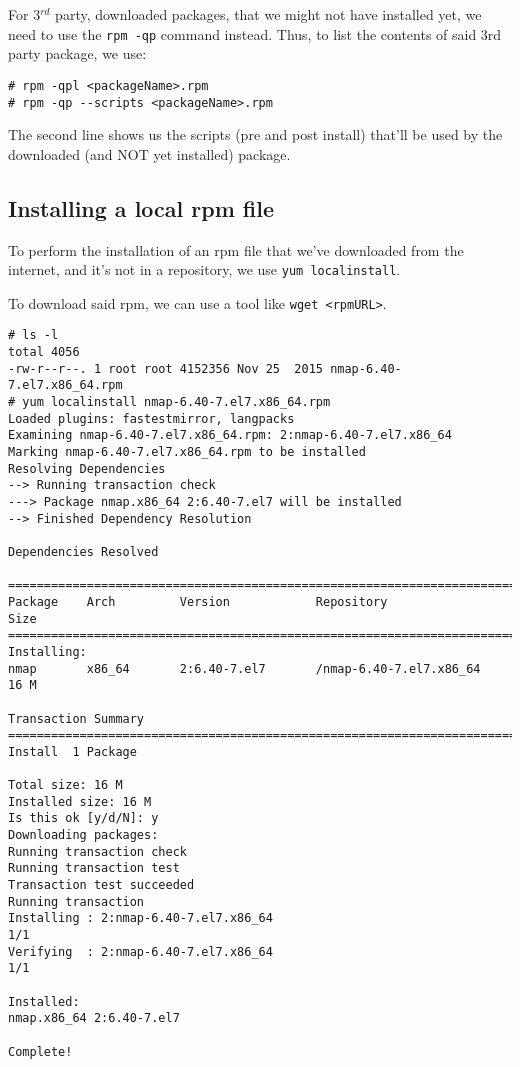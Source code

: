 For 3$^{rd}$ party, downloaded packages, that we might not have installed yet, we need to use the \verb|rpm -qp| command instead. Thus, to list the contents of said 3rd party package, we use:

\vspace{-15pt}
\begin{verbatim}
# rpm -qpl <packageName>.rpm
# rpm -qp --scripts <packageName>.rpm
\end{verbatim}
\vspace{-10pt}

\noindent
The second line shows us the scripts (pre and post install) that'll be used by the downloaded (and NOT yet installed) package. 

\subsection{Installing a local rpm file}
To perform the installation of an rpm file that we've downloaded from the internet, and it's not in a repository, we use \verb|yum localinstall|. 

To download said rpm, we can use a tool like \verb|wget <rpmURL>|.

\vspace{-15pt}
\begin{verbatim}
# ls -l
total 4056
-rw-r--r--. 1 root root 4152356 Nov 25  2015 nmap-6.40-7.el7.x86_64.rpm
# yum localinstall nmap-6.40-7.el7.x86_64.rpm 
Loaded plugins: fastestmirror, langpacks
Examining nmap-6.40-7.el7.x86_64.rpm: 2:nmap-6.40-7.el7.x86_64
Marking nmap-6.40-7.el7.x86_64.rpm to be installed
Resolving Dependencies
--> Running transaction check
---> Package nmap.x86_64 2:6.40-7.el7 will be installed
--> Finished Dependency Resolution

Dependencies Resolved

================================================================================
Package    Arch         Version            Repository                     Size
================================================================================
Installing:
nmap       x86_64       2:6.40-7.el7       /nmap-6.40-7.el7.x86_64        16 M

Transaction Summary
================================================================================
Install  1 Package

Total size: 16 M
Installed size: 16 M
Is this ok [y/d/N]: y
Downloading packages:
Running transaction check
Running transaction test
Transaction test succeeded
Running transaction
Installing : 2:nmap-6.40-7.el7.x86_64                                     1/1 
Verifying  : 2:nmap-6.40-7.el7.x86_64                                     1/1 

Installed:
nmap.x86_64 2:6.40-7.el7                                                      

Complete!
\end{verbatim}
\vspace{-10pt}

